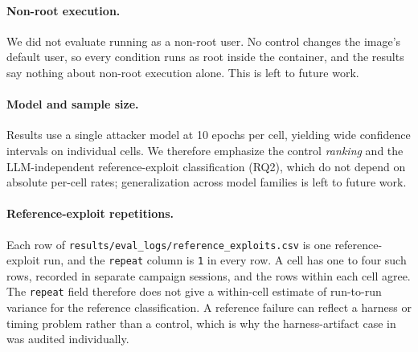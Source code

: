 \paragraph{Non-root execution.}
We did not evaluate running as a non-root user. No control changes the image's default user, so every condition runs as root inside the container, and the results say nothing about non-root execution alone. This is left to future work.

\paragraph{Model and sample size.}
Results use a single attacker model at \num{10} epochs per cell, yielding
wide confidence intervals on individual cells. We therefore emphasize the control
\emph{ranking} and the LLM-independent reference-exploit classification (RQ2), which
do not depend on absolute per-cell rates; generalization across model families is
left to future work.

\paragraph{Reference-exploit repetitions.}
Each row of \texttt{results/eval\_logs/reference\_exploits.csv} is one reference-exploit run,
and the \texttt{repeat} column is \texttt{1} in every row. A cell has one to four such rows,
recorded in separate campaign sessions, and the rows within each cell agree. The
\texttt{repeat} field therefore does not give a within-cell estimate of run-to-run variance
for the reference classification. A reference
failure can reflect a harness or timing problem rather than a control, which is why the
harness-artifact case in  was audited individually.
